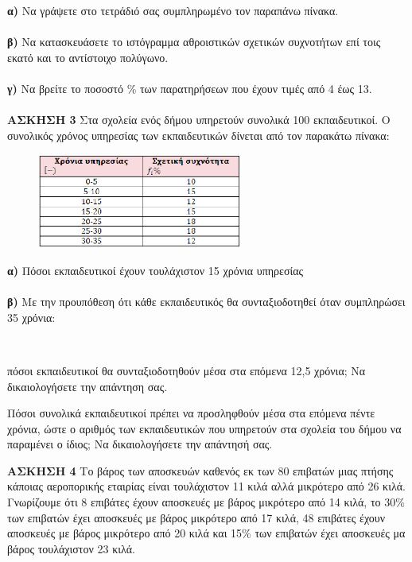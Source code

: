 \documentclass[11pt,a4paper]{article}
\begin{document}
\textbf{α)} Να γράψετε στο τετράδιό σας συμπληρωμένο τον παραπάνω πίνακα.\\
\\
\textbf{β)} Να κατασκευάσετε  το ιστόγραμμα αθροιστικών σχετικών συχνοτήτων επί τοις εκατό και το αντίστοιχο πολύγωνο.\\\\
\textbf{γ) }Να βρείτε το ποσοστό \% των παρατηρήσεων που έχουν τιμές από 4 έως 13. \\\\


\textbf{ΑΣΚΗΣΗ 3}  Στα σχολεία ενός δήμου υπηρετούν συνολικά 100 εκπαιδευτικοί. Ο συνολικός χρόνος υπηρεσίας των εκπαιδευτικών δίνεται από τον παρακάτω πίνακα: \\

\begin{figure}[hbtp]
\begin{center}
\includegraphics[width=0.6\textwidth, scale=0.5]{3.eps}
\end{center}
\end{figure}

\textbf{α)} Πόσοι εκπαιδευτικοί έχουν τουλάχιστον 15 χρόνια υπηρεσίας\; \\\\
\textbf{β)} Με την προυπόθεση ότι κάθε εκπαιδευτικός θα συνταξιοδοτηθεί όταν συμπληρώσει 35 χρόνια: 
\begin{inparaenum}[i.]\\ %
\item πόσοι εκπαιδευτικοί θα συνταξιοδοτηθούν μέσα στα επόμενα 12,5 χρόνια; Να δικαιολογήσετε την απάντηση σας. \\
\item Πόσοι συνολικά εκπαιδευτικοί πρέπει να προσληφθούν μέσα στα επόμενα πέντε χρόνια, ώστε ο αριθμός των εκπαιδευτικών που υπηρετούν στα σχολεία του δήμου να παραμένει ο ίδιος; Να δικαιολογήσετε την απάντησή σας. \\
\end{inparaenum}


\textbf{ΑΣΚΗΣΗ 4} Το βάρος των αποσκευών καθενός εκ των 80 επιβατών μιας πτήσης κάποιας αεροπορικής εταιρίας είναι τουλάχιστον 11 κιλά αλλά μικρότερο από 26 κιλά. Γνωρίζουμε ότι 8 επιβάτες έχουν αποσκευές με βάρος μικρότερο από 14 κιλά, το 30\% των επιβατών έχει αποσκευές με βάρος μικρότερο από 17 κιλά, 48 επιβάτες έχουν αποσκευές με βάρος μικρότερο από 20 κιλά και 15\% των επιβατών έχει αποσκευές μα βάρος τουλάχιστον 23 κιλά.\\
\end{document}
